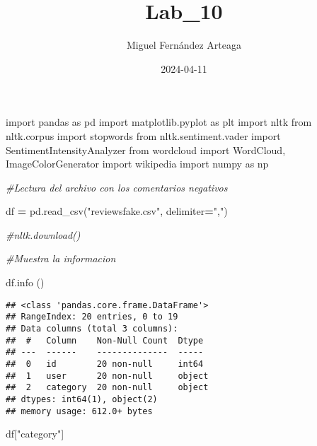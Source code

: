 \documentclass[
]{article}
\title{Lab\_10}
\author{Miguel Fernández Arteaga}
\date{2024-04-11}
\newenvironment{Shaded}{\begin{snugshade}}{\end{snugshade}}
\newcommand{\CommentTok}[1]{\textcolor[rgb]{0.56,0.35,0.01}{\textit{#1}}}
\newcommand{\ImportTok}[1]{#1}
\newcommand{\NormalTok}[1]{#1}
\newcommand{\OperatorTok}[1]{\textcolor[rgb]{0.81,0.36,0.00}{\textbf{#1}}}
\newcommand{\StringTok}[1]{\textcolor[rgb]{0.31,0.60,0.02}{#1}}
\begin{document}
\maketitle

\begin{Shaded}
\begin{Highlighting}[]
\ImportTok{import}\NormalTok{ pandas }\ImportTok{as}\NormalTok{ pd}
\ImportTok{import}\NormalTok{ matplotlib.pyplot }\ImportTok{as}\NormalTok{ plt}
\ImportTok{import}\NormalTok{ nltk}
\ImportTok{from}\NormalTok{ nltk.corpus }\ImportTok{import}\NormalTok{ stopwords}
\ImportTok{from}\NormalTok{ nltk.sentiment.vader }\ImportTok{import}\NormalTok{ SentimentIntensityAnalyzer}
\ImportTok{from}\NormalTok{ wordcloud }\ImportTok{import}\NormalTok{ WordCloud, ImageColorGenerator }
\ImportTok{import}\NormalTok{ wikipedia}
\ImportTok{import}\NormalTok{ numpy }\ImportTok{as}\NormalTok{ np}

\CommentTok{\#Lectura del archivo con los comentarios negativos}

\NormalTok{df }\OperatorTok{=}\NormalTok{ pd.read\_csv(}\StringTok{"reviewsfake.csv"}\NormalTok{, delimiter}\OperatorTok{=}\StringTok{","}\NormalTok{)}

\CommentTok{\#nltk.download()}

\CommentTok{\#Muestra la informacion}

\NormalTok{df.info ()}
\end{Highlighting}
\end{Shaded}

\begin{verbatim}
## <class 'pandas.core.frame.DataFrame'>
## RangeIndex: 20 entries, 0 to 19
## Data columns (total 3 columns):
##  #   Column    Non-Null Count  Dtype 
## ---  ------    --------------  ----- 
##  0   id        20 non-null     int64 
##  1   user      20 non-null     object
##  2   category  20 non-null     object
## dtypes: int64(1), object(2)
## memory usage: 612.0+ bytes
\end{verbatim}

\begin{Shaded}
\begin{Highlighting}[]
\NormalTok{df[}\StringTok{"category"}\NormalTok{]}
\end{Highlighting}
\end{Shaded}
\end{document}
